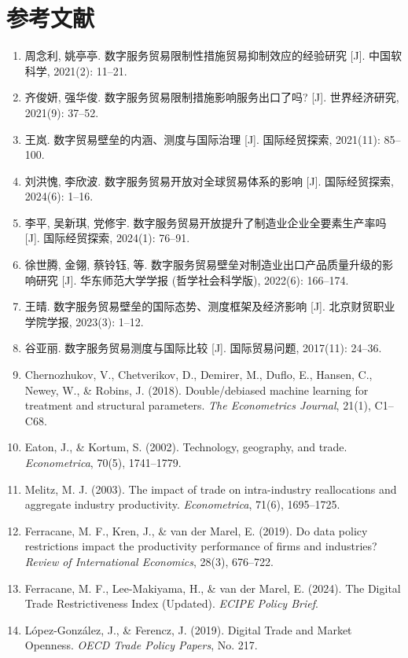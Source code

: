 \documentclass[11pt,a4paper]{article}
\begin{document}
\section*{参考文献}
\begin{enumerate}[leftmargin=2em]
\small
\item[{[1]}] 周念利, 姚亭亭. 数字服务贸易限制性措施贸易抑制效应的经验研究 [J]. 中国软科学, 2021(2): 11--21.
\item[{[2]}] 齐俊妍, 强华俊. 数字服务贸易限制措施影响服务出口了吗? [J]. 世界经济研究, 2021(9): 37--52.
\item[{[3]}] 王岚. 数字贸易壁垒的内涵、测度与国际治理 [J]. 国际经贸探索, 2021(11): 85--100.
\item[{[4]}] 刘洪愧, 李欣波. 数字服务贸易开放对全球贸易体系的影响 [J]. 国际经贸探索, 2024(6): 1--16.
\item[{[5]}] 李平, 吴新琪, 党修宇. 数字服务贸易开放提升了制造业企业全要素生产率吗 [J]. 国际经贸探索, 2024(1): 76--91.
\item[{[6]}] 徐世腾, 金翎, 蔡铃钰, 等. 数字服务贸易壁垒对制造业出口产品质量升级的影响研究 [J]. 华东师范大学学报 (哲学社会科学版), 2022(6): 166--174.
\item[{[7]}] 王晴. 数字服务贸易壁垒的国际态势、测度框架及经济影响 [J]. 北京财贸职业学院学报, 2023(3): 1--12.
\item[{[8]}] 谷亚丽. 数字服务贸易测度与国际比较 [J]. 国际贸易问题, 2017(11): 24--36.
\item[{[9]}] Chernozhukov, V., Chetverikov, D., Demirer, M., Duflo, E., Hansen, C., Newey, W., \& Robins, J. (2018). Double/debiased machine learning for treatment and structural parameters. \textit{The Econometrics Journal}, 21(1), C1--C68.
\item[{[10]}] Eaton, J., \& Kortum, S. (2002). Technology, geography, and trade. \textit{Econometrica}, 70(5), 1741--1779.
\item[{[11]}] Melitz, M. J. (2003). The impact of trade on intra-industry reallocations and aggregate industry productivity. \textit{Econometrica}, 71(6), 1695--1725.
\item[{[12]}] Ferracane, M. F., Kren, J., \& van der Marel, E. (2019). Do data policy restrictions impact the productivity performance of firms and industries? \textit{Review of International Economics}, 28(3), 676--722.
\item[{[13]}] Ferracane, M. F., Lee-Makiyama, H., \& van der Marel, E. (2024). The Digital Trade Restrictiveness Index (Updated). \textit{ECIPE Policy Brief}.
\item[{[14]}] López-González, J., \& Ferencz, J. (2019). Digital Trade and Market Openness. \textit{OECD Trade Policy Papers}, No. 217.

\end{enumerate}
\end{document}
